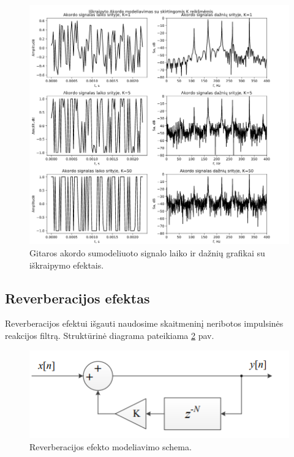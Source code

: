 \documentclass[10pt,a4paper,twocolumn]{article}
\begin{document}
\begin{figure} %
	[!h]
	\centering
	\includegraphics*[width=.9\columnwidth]{akordas_3.png} %
	\caption{Gitaros akordo sumodeliuoto signalo laiko ir dažnių grafikai su iškraipymo efektais.}
	\label{akordas_3}
	\vspace{6pt}
\end{figure}


\subsection*{Reverberacijos efektas}

Reverberacijos efektui išgauti naudosime skaitmeninį neribotos impulsinės reakcijos filtrą. Struktūrinė diagrama pateikiama \ref{reverb_1} pav.

\begin{figure} %
	[!h]
	\centering
	\includegraphics*[width=.9\columnwidth]{reverb_schema.png} %
	\caption{Reverberacijos efekto modeliavimo schema.}
	\label{reverb_1}
	\vspace{6pt}
\end{figure}
\end{document}
